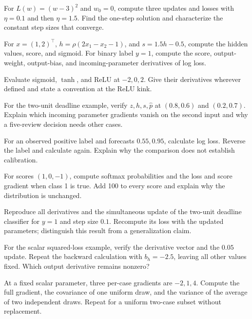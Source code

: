 \begin{exercises}
\item {}For $L(w)=(w-3)^2$ and $w_0=0$, compute three updates and losses with $\eta=0.1$ and then $\eta=1.5$. Find the one-step solution and characterize the constant step sizes that converge.
\item {}For $x=(1,2)^\top$, $h=\rho(2x_1-x_2-1)$, and $s=1.5h-0.5$, compute the hidden values, score, and sigmoid. For binary label $y=1$, compute the score, output-weight, output-bias, and incoming-parameter derivatives of log loss.
\item {}Evaluate sigmoid, $\tanh$, and ReLU at $-2,0,2$. Give their derivatives wherever defined and state a convention at the ReLU kink.
\item {}For the two-unit deadline example, verify $z,h,s,\hat p$ at $(0.8,0.6)$ and $(0.2,0.7)$. Explain which incoming parameter gradients vanish on the second input and why a five-review decision needs other cases.
\item {}For an observed positive label and forecasts $0.55,0.95$, calculate log loss. Reverse the label and calculate again. Explain why the comparison does not establish calibration.
\item {}For scores $(1,0,-1)$, compute softmax probabilities and the loss and score gradient when class 1 is true. Add 100 to every score and explain why the distribution is unchanged.
\item {}Reproduce all derivatives and the simultaneous update of the two-unit deadline classifier for $y=1$ and step size $0.1$. Recompute its loss with the updated parameters; distinguish this result from a generalization claim.
\item {}For the scalar squared-loss example, verify the derivative vector and the $0.05$ update. Repeat the backward calculation with $b_h=-2.5$, leaving all other values fixed. Which output derivative remains nonzero?
\item {}At a fixed scalar parameter, three per-case gradients are $-2,1,4$. Compute the full gradient, the covariance of one uniform draw, and the variance of the average of two independent draws. Repeat for a uniform two-case subset without replacement.

\end{exercises}
